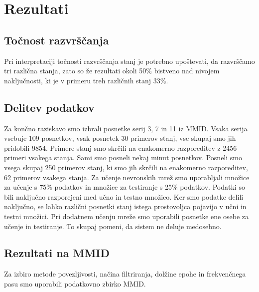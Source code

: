 \chapter{Rezultati}
\section{Točnost razvrščanja}
Pri interpretaciji točnosti razvrščanja stanj je potrebno upoštevati, da razvrščamo tri različna stanja, zato so že rezultati okoli 50\% bistveno nad nivojem naključnosti, ki je v primeru treh različnih stanj 33\%.
\section{Delitev podatkov}
Za končno raziskavo smo izbrali posnetke serij 3, 7 in 11 iz MMID. Vsaka serija vsebuje 109 posnetkov, vsak posnetek 30 primerov stanj, vse skupaj smo jih pridobili 9854. Primere stanj smo skrčili na enakomerno razporeditev z 2456 primeri vsakega stanja. Sami smo posneli nekaj minut posnetkov. Posneli smo vsega skupaj 250 primerov stanj, ki smo jih skrčili na enakomerno razporeditev, 62 primerov vsakega stanja. Za učenje nevronskih mrež smo uporabljali množice za učenje s 75\% podatkov in množice za testiranje s 25\% podatkov. Podatki so bili naključno razporejeni med učno in testno množico. Ker smo podatke delili naključno, se lahko različni posnetki stanj istega prostovoljca pojavijo v učni in testni množici. Pri dodatnem učenju mreže smo uporabili posnetke ene osebe za učenje in testiranje. To skupaj pomeni, da sistem ne deluje medosebno.


\section{Rezultati na MMID}
Za izbiro metode povezljivosti, načina filtriranja, dolžine epohe in frekvenčnega pasu smo uporabili podatkovno zbirko MMID.

